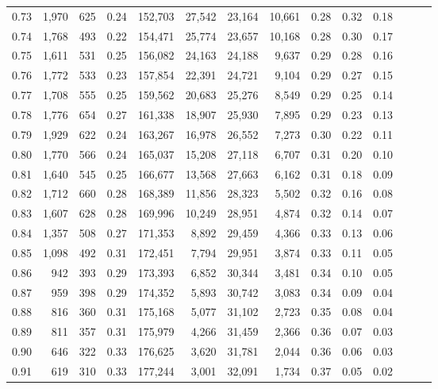 \begin{tabular}{rrrrrrrrrrrrrr}
0.73 &  1,970 &  625 &  0.24 &  152,703 &   27,542 &  23,164 &  10,661 &  0.28 &  0.32 &      0.18 \\
0.74 &  1,768 &  493 &  0.22 &  154,471 &   25,774 &  23,657 &  10,168 &  0.28 &  0.30 &      0.17 \\
0.75 &  1,611 &  531 &  0.25 &  156,082 &   24,163 &  24,188 &   9,637 &  0.29 &  0.28 &      0.16 \\
0.76 &  1,772 &  533 &  0.23 &  157,854 &   22,391 &  24,721 &   9,104 &  0.29 &  0.27 &      0.15 \\
0.77 &  1,708 &  555 &  0.25 &  159,562 &   20,683 &  25,276 &   8,549 &  0.29 &  0.25 &      0.14 \\
0.78 &  1,776 &  654 &  0.27 &  161,338 &   18,907 &  25,930 &   7,895 &  0.29 &  0.23 &      0.13 \\
0.79 &  1,929 &  622 &  0.24 &  163,267 &   16,978 &  26,552 &   7,273 &  0.30 &  0.22 &      0.11 \\
0.80 &  1,770 &  566 &  0.24 &  165,037 &   15,208 &  27,118 &   6,707 &  0.31 &  0.20 &      0.10 \\
0.81 &  1,640 &  545 &  0.25 &  166,677 &   13,568 &  27,663 &   6,162 &  0.31 &  0.18 &      0.09 \\
0.82 &  1,712 &  660 &  0.28 &  168,389 &   11,856 &  28,323 &   5,502 &  0.32 &  0.16 &      0.08 \\
0.83 &  1,607 &  628 &  0.28 &  169,996 &   10,249 &  28,951 &   4,874 &  0.32 &  0.14 &      0.07 \\
0.84 &  1,357 &  508 &  0.27 &  171,353 &    8,892 &  29,459 &   4,366 &  0.33 &  0.13 &      0.06 \\
0.85 &  1,098 &  492 &  0.31 &  172,451 &    7,794 &  29,951 &   3,874 &  0.33 &  0.11 &      0.05 \\
0.86 &    942 &  393 &  0.29 &  173,393 &    6,852 &  30,344 &   3,481 &  0.34 &  0.10 &      0.05 \\
0.87 &    959 &  398 &  0.29 &  174,352 &    5,893 &  30,742 &   3,083 &  0.34 &  0.09 &      0.04 \\
0.88 &    816 &  360 &  0.31 &  175,168 &    5,077 &  31,102 &   2,723 &  0.35 &  0.08 &      0.04 \\
0.89 &    811 &  357 &  0.31 &  175,979 &    4,266 &  31,459 &   2,366 &  0.36 &  0.07 &      0.03 \\
0.90 &    646 &  322 &  0.33 &  176,625 &    3,620 &  31,781 &   2,044 &  0.36 &  0.06 &      0.03 \\
0.91 &    619 &  310 &  0.33 &  177,244 &    3,001 &  32,091 &   1,734 &  0.37 &  0.05 &      0.02 \\

\end{tabular}
